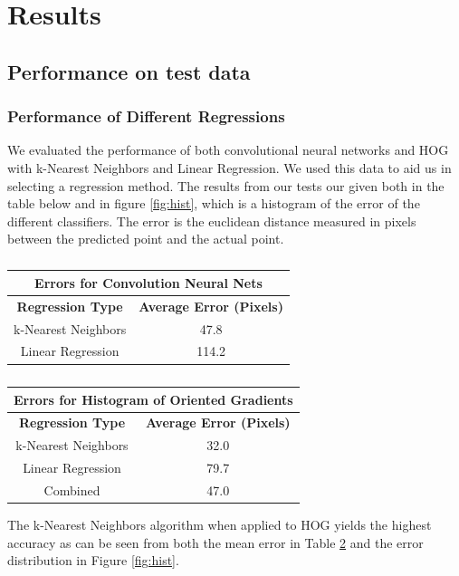 \documentclass[10pt,twocolumn,letterpaper]{article}
\begin{document}
\section{Results}

\subsection{Performance on test data}

\subsubsection{Performance of Different Regressions}
We evaluated the performance of both convolutional neural networks and HOG with k-Nearest Neighbors and Linear Regression. We used this data to aid us in selecting a regression method. The results from our tests our given both in the table below and in figure \ref{fig:hist}, which is a histogram of the error of the different classifiers. The error is the euclidean distance measured in pixels between the predicted point and the actual point.

\begin{table}
	\caption{}
	\begin{center}
		\begin{tabular}{|c|c|}
			\hline
			\multicolumn{2}{|c|}{\textbf{Errors for Convolution Neural Nets}}\\\hline
			\textbf{Regression Type} & \textbf{Average Error (Pixels)} \\\hline
			k-Nearest Neighbors & 47.8 \\\hline
			Linear Regression &  114.2 \\\hline	
		\end{tabular}
		\begin{tabular}{|c|c|}
			\hline
			\multicolumn{2}{|c|}{\textbf{Errors for Histogram of Oriented Gradients}} \\\hline
			\textbf{Regression Type} & \textbf{Average Error (Pixels)} \\\hline
			k-Nearest Neighbors & 32.0\\\hline
			Linear Regression & 79.7 \\\hline
			Combined & 47.0 \\\hline
		\end{tabular}
	\end{center}
	\label{table:meanErrors}
\end{table}

The k-Nearest Neighbors algorithm when applied to HOG yields the highest accuracy as can be seen from both the mean error in Table \ref{table:meanErrors} and the error distribution in Figure \ref{fig:hist}. 
 
\end{document}
